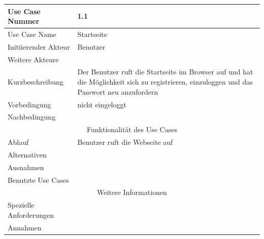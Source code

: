 \documentclass[10pt,a4paper]{article}
\begin{document}
	\begin{tabular}{|l|p{.5\linewidth}|}
	\hline Use Case Nummer & 1.1 \\ 
	\hline Use Case Name & Startseite \\ 
	\hline Initiierender Akteur & Benutzer \\
	\hline Weitere Akteure &  \\
	\hline Kurzbeschreibung & Der Benutzer ruft die Startseite im Browser auf und hat die M\"oglichkeit sich zu registrieren, einzuloggen und das Passwort neu anzufordern \\
	\hline Vorbedingung & nicht eingeloggt \\
	\hline Nachbedingung &  \\
	\hline \multicolumn{2}{|c|}{Funktionalität des Use Cases}\\
	\hline Ablauf & Benutzer ruft die Webseite auf \\
	\hline Alternativen &  \\
	\hline Ausnahmen &  \\
	\hline Benutzte Use Cases &  \\
	\hline \multicolumn{2}{|c|}{Weitere Informationen} \\
	\hline Spezielle Anforderungen &  \\
	\hline Annahmen &  \\
	\hline
	\end{tabular} 
\end{document}
